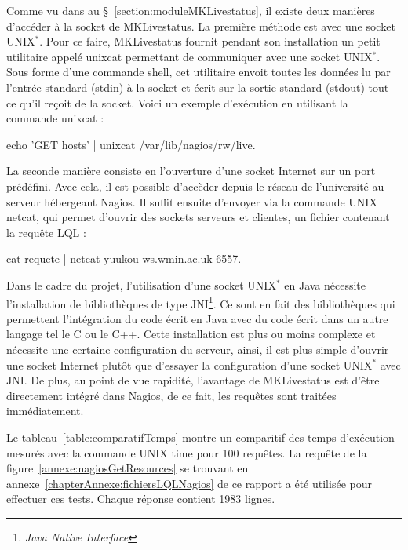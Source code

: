 Comme vu dans au \S~\ref{section:moduleMKLivestatus}, il existe deux mani\`eres d'acc\'eder \`a la socket de MKLivestatus.
La premi\`ere m\'ethode est avec une socket UNIX$^*$. 
Pour ce faire, MKLivestatus fournit pendant son installation un petit utilitaire appel\'e \textsf{unixcat} permettant de communiquer avec une socket UNIX$^*$.
Sous forme d'une commande shell, cet utilitaire envoit toutes les donn\'ees lu par l'entr\'ee standard (stdin) \`a la socket et \'ecrit sur la sortie standard (stdout) tout ce qu'il re\c{c}oit de la socket.
Voici un exemple d'ex\'ecution en utilisant la commande \textsf{unixcat} : 

\begin{center}
	\textsf{echo 'GET hosts' | unixcat /var/lib/nagios/rw/live}.

\end{center}

La seconde mani\`ere consiste en l'ouverture d'une socket Internet sur un port pr\'ed\'efini.
Avec cela, il est possible d'acc\`eder depuis le r\'eseau de l'universit\'e au serveur h\'ebergeant Nagios.
Il suffit ensuite d'envoyer via la commande UNIX \textsf{netcat}, qui permet d'ouvrir des sockets serveurs et clientes, un fichier contenant la requ\^ete LQL :

\begin{center}
	\textsf{cat requete | netcat yuukou-ws.wmin.ac.uk 6557}.

\end{center}

Dans le cadre du projet, l'utilisation d'une socket UNIX$^*$ en Java n\'ecessite l'installation de biblioth\`eques de type JNI\protect\footnote{\textit{Java Native Interface}}.
Ce sont en fait des biblioth\`eques qui permettent l'int\'egration du code \'ecrit en Java avec du code \'ecrit dans un autre langage tel le C ou le C++.
Cette installation est plus ou moins complexe et n\'ecessite une certaine configuration du serveur, ainsi, il est plus simple d'ouvrir une socket Internet plut\^ot que d'essayer la configuration d'une socket UNIX$^*$ avec JNI.
De plus, au point de vue rapidit\'e, l'avantage de MKLivestatus est d'\^etre directement int\'egr\'e dans Nagios, de ce fait, les requ\^etes sont trait\'ees imm\'ediatement.

Le tableau~\ref{table:comparatifTemps} montre un comparitif des temps d'ex\'ecution mesur\'es avec la commande UNIX \textsf{time} pour 100 requ\^etes.
La requ\^ete de la figure~\ref{annexe:nagiosGetResources} se trouvant en annexe~\ref{chapterAnnexe:fichiersLQLNagios} de ce rapport a \'et\'e utilis\'ee pour effectuer ces tests.
Chaque r\'eponse contient 1983 lignes.

